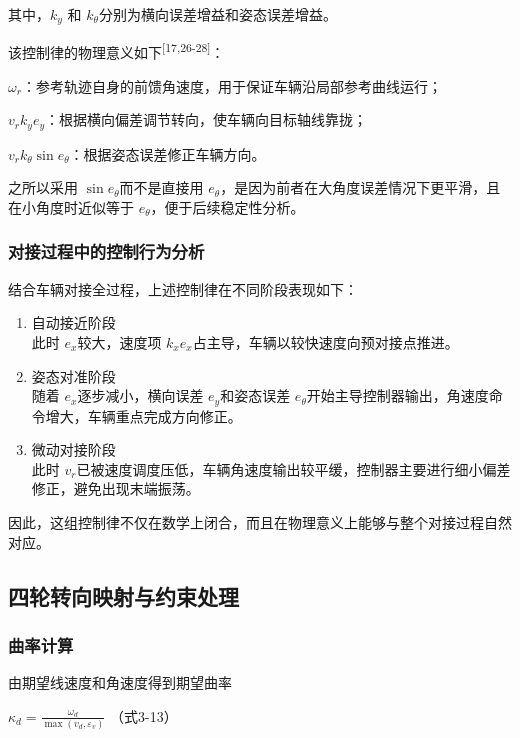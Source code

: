 \documentclass[UTF8,a4paper,12pt]{ctexart}
\begin{document}
其中，\(k_{y}\) 和 \(k_{\theta}\)分别为横向误差增益和姿态误差增益。

该控制律的物理意义如下\textsuperscript{[17,26-28]}：

\(\omega_{r}\)：参考轨迹自身的前馈角速度，用于保证车辆沿局部参考曲线运行；

\(v_{r}k_{y}e_{y}\)：根据横向偏差调节转向，使车辆向目标轴线靠拢；

\(v_{r}k_{\theta}\sin e_{\theta}\)：根据姿态误差修正车辆方向。

之所以采用 \(\sin e_{\theta}\)而不是直接用 \(e_{\theta}\)，是因为前者在大角度误差情况下更平滑，且在小角度时近似等于 \(e_{\theta}\)，便于后续稳定性分析。

\subsubsection{对接过程中的控制行为分析}\label{_Toc228997209}

结合车辆对接全过程，上述控制律在不同阶段表现如下：

\begin{enumerate}
\def\labelenumi{\arabic{enumi}.}
\item
  自动接近阶段\\
  此时 \(e_{x}\)较大，速度项 \(k_{x}e_{x}\)占主导，车辆以较快速度向预对接点推进。
\item
  姿态对准阶段\\
  随着 \(e_{x}\)逐步减小，横向误差 \(e_{y}\)和姿态误差 \(e_{\theta}\)开始主导控制器输出，角速度命令增大，车辆重点完成方向修正。
\item
  微动对接阶段\\
  此时 \(v_{r}\)已被速度调度压低，车辆角速度输出较平缓，控制器主要进行细小偏差修正，避免出现末端振荡。
\end{enumerate}

因此，这组控制律不仅在数学上闭合，而且在物理意义上能够与整个对接过程自然对应。

\subsection{四轮转向映射与约束处理}\label{_Toc228997210}

\subsubsection{曲率计算}\label{_Toc228997211}

由期望线速度和角速度得到期望曲率

\(\kappa_{d} = \frac{\omega_{d}}{\max(v_{d},\varepsilon_{v})}\) （式3-13）
\end{document}
